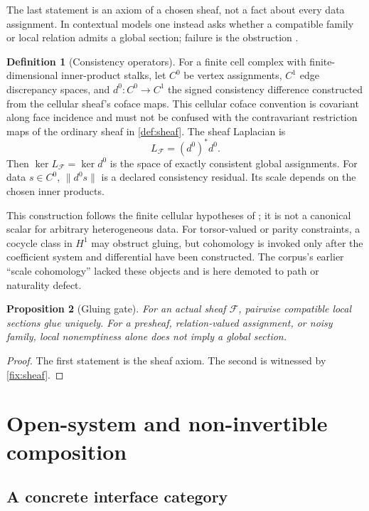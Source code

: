 \documentclass[11pt,a4paper]{article}
\theoremstyle{definition}
\newtheorem{definition}{Definition}[section]
\theoremstyle{plain}
\newtheorem{proposition}[definition]{Proposition}
\theoremstyle{remark}
\newcommand{\kernel}{\operatorname{ker}}
\begin{document}
The last statement is an axiom of a chosen sheaf, not a fact about every data
assignment.  In contextual models one instead asks whether a compatible family
or local relation admits a global section; failure is the obstruction
\citep{abramskybrandenburger2011}.

\begin{definition}[Consistency operators]\label{def:sheaflap}
For a finite cell complex with finite-dimensional inner-product stalks, let
\(C^0\) be vertex assignments, \(C^1\) edge discrepancy spaces, and
\(d^0:C^0\to C^1\) the signed consistency difference constructed from the
cellular sheaf's coface maps.  This cellular coface convention is covariant
along face incidence and must not be confused with the contravariant
restriction maps of the ordinary sheaf in \cref{def:sheaf}.  The sheaf
Laplacian is
\[
L_{\mathscr F}=(d^0)^*d^0.
\]
Then \(\kernel L_{\mathscr F}=\kernel d^0\) is the space of exactly consistent
global assignments.  For data \(s\in C^0\), \(\|d^0s\|\) is a declared
consistency residual.  Its scale depends on the chosen inner products.
\end{definition}

This construction follows the finite cellular hypotheses of
\citet{hansenghrist2019}; it is not a canonical scalar for arbitrary
heterogeneous data.  For torsor-valued or parity constraints, a cocycle class
in \(H^1\) may obstruct gluing, but cohomology is invoked only after the
coefficient system and differential have been constructed.  The corpus's
earlier ``scale cohomology'' lacked these objects and is here demoted to path or
naturality defect.

\begin{proposition}[Gluing gate]\label{prop:gluing}
For an actual sheaf \(\mathscr F\), pairwise compatible local sections glue
uniquely.  For a presheaf, relation-valued assignment, or noisy family, local
nonemptiness alone does not imply a global section.
\end{proposition}
\begin{proof}
The first statement is the sheaf axiom.  The second is witnessed by
\cref{fix:sheaf}.
\end{proof}

\section{Open-system and non-invertible composition}\label{sec:open}

\subsection{A concrete interface category}
\end{document}
